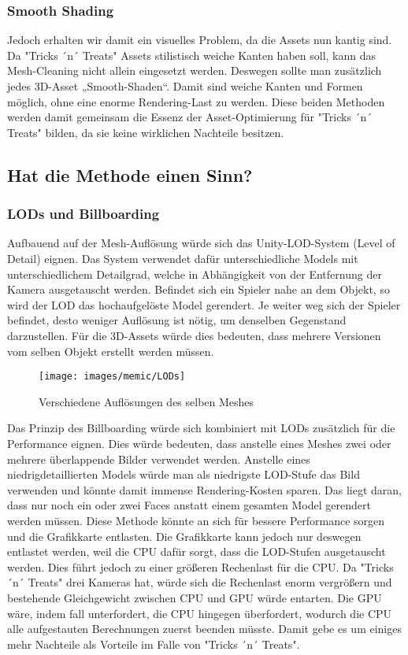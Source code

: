 \subsubsection{Smooth Shading}

Jedoch erhalten wir damit ein visuelles Problem, da die Assets nun kantig sind. Da "Tricks ´n´ Treats" Assets stilistisch weiche Kanten haben soll, kann das Mesh-Cleaning nicht allein eingesetzt werden. Deswegen sollte man zusätzlich jedes 3D-Asset „Smooth-Shaden“. Damit sind weiche Kanten und Formen möglich, ohne eine enorme Rendering-Last zu werden. Diese beiden Methoden werden damit gemeinsam die Essenz der Asset-Optimierung für "Tricks ´n´ Treats" bilden, da sie keine wirklichen Nachteile besitzen.

\subsection{Hat die Methode einen Sinn?}

\subsubsection{LODs und Billboarding}

Aufbauend auf der Mesh-Auflösung würde sich das Unity-LOD-System (Level of Detail) eignen. Das System verwendet dafür unterschiedliche Models mit unterschiedlichem Detailgrad, welche in Abhängigkeit von der Entfernung der Kamera ausgetauscht werden. Befindet sich ein Spieler nahe an dem Objekt, so wird der LOD das hochaufgelöste Model gerendert. Je weiter weg sich der Spieler befindet, desto weniger Auflösung ist nötig, um denselben Gegenstand darzustellen. Für die 3D-Assets würde dies bedeuten, dass mehrere Versionen vom selben Objekt erstellt werden müssen.

\begin{figure}[H]
	\centering
	\texttt{[image: images/memic/LODs]}
	\caption{Verschiedene Auflösungen des selben Meshes}
\end{figure}

Das Prinzip des Billboarding würde sich kombiniert mit LODs zusätzlich für die Performance eignen. Dies würde bedeuten, dass anstelle eines Meshes zwei oder mehrere überlappende Bilder verwendet werden. Anstelle eines niedrigdetaillierten Models würde man als niedrigste LOD-Stufe das Bild verwenden und könnte damit immense Rendering-Kosten sparen. Das liegt daran, dass nur noch ein oder zwei Faces anstatt einem gesamten Model gerendert werden müssen.
Diese Methode könnte an sich für bessere Performance sorgen und die Grafikkarte entlasten. Die Grafikkarte kann jedoch nur deswegen entlastet werden, weil die CPU dafür sorgt, dass die LOD-Stufen ausgetauscht werden. Dies führt jedoch zu einer größeren Rechenlast für die CPU. Da "Tricks ´n´ Treats" drei Kameras hat, würde sich die Rechenlast enorm vergrößern und bestehende Gleichgewicht zwischen CPU und GPU würde entarten. Die GPU wäre, indem fall unterfordert, die CPU hingegen überfordert, wodurch die CPU alle aufgestauten Berechnungen zuerst beenden müsste. Damit gebe es um einiges mehr Nachteile als Vorteile im Falle von "Tricks ´n´ Treats".


